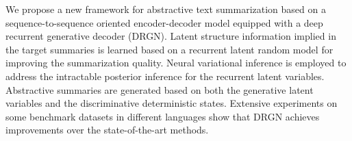 We propose a new framework for abstractive text summarization based on a sequence-to-sequence oriented encoder-decoder model equipped with a deep recurrent generative decoder (DRGN). Latent structure information implied in the target summaries is learned based on a recurrent latent random model for improving the summarization quality. Neural variational inference is employed to address the intractable posterior inference for the recurrent latent variables. Abstractive summaries are generated based on both the generative latent variables and the discriminative deterministic states. Extensive experiments on some benchmark datasets in different languages show that DRGN achieves improvements over the state-of-the-art methods.
